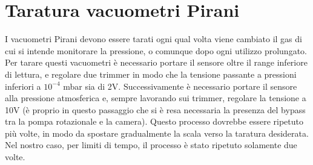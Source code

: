 \documentclass[11pt]{article}
\begin{document}
\section{Taratura vacuometri Pirani}
I vacuometri Pirani devono essere tarati ogni qual volta viene cambiato il gas di cui si intende monitorare la pressione, o comunque dopo ogni utilizzo prolungato. Per tarare questi vacuometri è necessario portare il sensore oltre il range inferiore di lettura, e regolare due trimmer in modo che la tensione passante a pressioni inferiori a $10^{-4}$ mbar sia di 2V. Successivamente è necessario portare il sensore alla pressione atmosferica e, sempre lavorando sui trimmer, regolare la tensione a 10V (è proprio in questo passaggio che si è resa necessaria la presenza del bypass tra la pompa rotazionale e la camera). Questo processo dovrebbe essere ripetuto più volte, in modo da spostare gradualmente la scala verso la taratura desiderata. Nel nostro caso, per limiti di tempo, il processo è stato ripetuto solamente due volte.  
\end{document}
